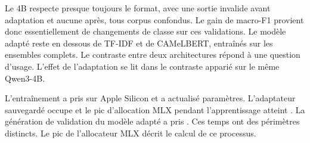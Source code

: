 Le 4B respecte presque toujours le format, avec une sortie invalide avant adaptation et aucune après, tous corpus confondus. Le gain de macro-F1 provient donc essentiellement de changements de classe sur ces validations. Le modèle adapté reste en dessous de TF-IDF et de CAMeLBERT, entraînés sur les ensembles complets. Le contraste entre deux architectures répond à une question d’usage. L’effet de l’adaptation se lit dans le contraste apparié sur le même Qwen3-4B.

L’entraînement a pris \TrainingDuration{} sur Apple Silicon et a actualisé \AdapterParameters{} paramètres. L’adaptateur sauvegardé occupe \AdapterSize{} et le pic d’allocation MLX pendant l’apprentissage atteint \TrainMemory{}. La génération de validation du modèle adapté a pris \AfterDuration{}. Ces temps ont des périmètres distincts. Le pic de l’allocateur MLX décrit le calcul de ce processus.
\FloatBarrier
